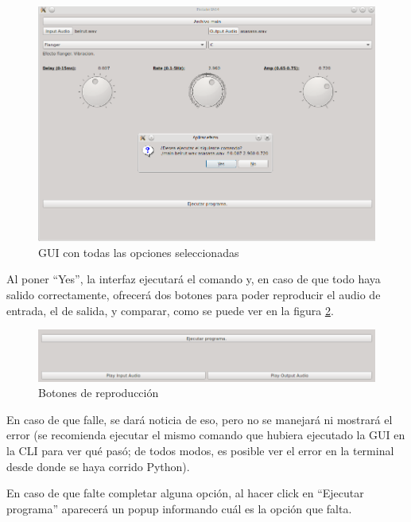 \begin{figure}[H]
    \centering
    \includegraphics[scale=0.68]{imagenes/gui-complete.png}
    \caption{GUI con todas las opciones seleccionadas}
    \label{fig:gui-complete}
\end{figure}

\begin{center}
\end{center}\vspace{\baselineskip}

Al poner ``Yes'', la interfaz ejecutará el comando y, en caso de que todo haya salido correctamente, ofrecerá dos botones para poder reproducir el audio de entrada, el de salida, y comparar, como se puede ver en la figura \ref{fig:gui-play-buttons}.

\begin{figure}[H]
    \centering
    \includegraphics[scale=0.68]{imagenes/gui-play-buttons.png}
    \caption{Botones de reproducción}
    \label{fig:gui-play-buttons}
\end{figure}

En caso de que falle, se dará noticia de eso, pero no se manejará ni mostrará el error (se recomienda ejecutar el mismo comando que hubiera ejecutado la GUI en la CLI para ver qué pasó; de todos modos, es posible ver el error en la terminal desde donde se haya corrido Python).

En caso de que falte completar alguna opción, al hacer click en ``Ejecutar programa'' aparecerá un popup informando cuál es la opción que falta. 

